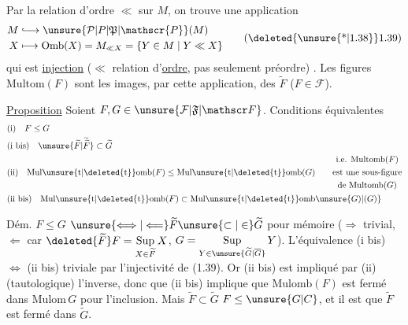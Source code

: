 
Par la relation d'ordre $\ll$ sur $M$, on trouve une application
\[
 \begin{aligned}
 M&\lhook\joinrel\longrightarrow\unsure{\mathcal{P}|P|\mathfrak{P}|\mathscr{P}}(M)\\
 X&\longmapsto\mathrm{Omb}(X)=M_{\ll X}=\{Y\in M\mid Y\ll X\}
 \end{aligned}
 \tag*{(\deleted{\unsure{*|1.38}}1.39)}
\]
qui est \uline{injection} ($\ll$ relation d'\uline{ordre}, pas seulement préordre) . Les figures $\mathrm{Multom}(F)$ sont les images, par cette application, des $\widetilde F$ ($F\in\mathcal{F}$). 


\uline{Proposition} Soient $F,G\in\unsure{\mathcal F|\mathfrak F|\mathscr F}$. Conditions équivalentes
\[
\begin{aligned}
&\text{(i)}\quad F\leq G\\
&\text{(i bis)}\quad \unsure{\widetilde F|\widetilde{\widetilde F}}\subset\widetilde G\\
&\text{(ii)}\quad \mathrm{Mul\unsure{t|\deleted{t}}omb}(F)\leq\mathrm{Mul\unsure{t|\deleted{t}}omb}(G)
 \qquad\begin{gathered}\text{i.e. }\mathrm{Multomb}(F)\\\text{est une sous-figure}\\\text{de }\mathrm{Multomb}(G)\end{gathered}\\
&\text{(ii bis)}\quad \mathrm{Mul\unsure{t|\deleted{t}}omb}(F)\subset\mathrm{Mul\unsure{t|\deleted{t}}omb}\unsure{G)|(G)}
\end{aligned}
\]

Dém. $F\leq G$  $\unsure{\Longleftrightarrow|\Longleftarrow}\widetilde F\unsure{\subset|\in}\widetilde G$   pour mémoire ($\Longrightarrow$ trivial, $\Longleftarrow$ car $\deleted{\widetilde F}F=\mathop{\mathrm{Sup}}\limits_{X\in\widetilde F}X$, $G=\mathop{\mathrm{Sup}}\limits_{Y\in\unsure{\widetilde G|\overline G}}Y$). L'équivalence (i bis) $\Longleftrightarrow$ (ii bis) triviale par l'injectivité de (1.39). Or (ii bis) est impliqué par (ii) (tautologique)  l'inverse, donc que (ii bis) implique que $\mathrm{Mulomb}(F)$ est fermé dans $\mathrm{Mulom}\,G$ pour l'inclusion. Mais  $\widetilde F\subset\widetilde G$   $F\leq\unsure{G|C}$, et il est  que $\widetilde F$ est  fermé dans $\widetilde G$.

